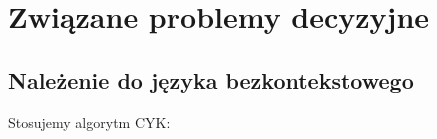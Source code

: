 \section{Związane problemy decyzyjne}

\subsection{Należenie do języka bezkontekstowego} 

Stosujemy algorytm CYK: 